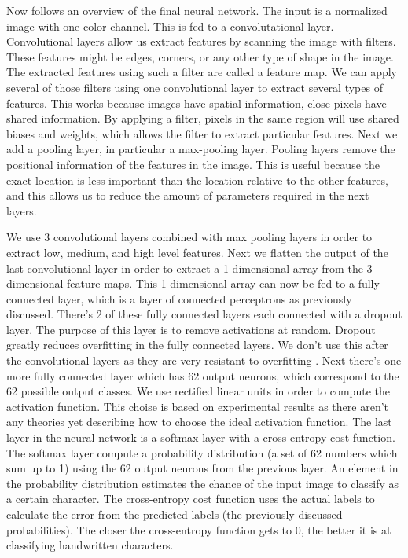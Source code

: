 \documentclass{article}
\begin{document}
Now follows an overview of the final neural network. The input is a normalized image with one color channel. This is fed to a convolutational layer. Convolutional layers allow us extract features by scanning the image with filters. These features might be edges, corners, or any other type of shape in the image. The extracted features using such a filter are called a feature map. We can apply several of those filters using one convolutional layer to extract several types of features. This works because images have spatial information, close pixels have shared information. By applying a filter, pixels in the same region will use shared biases and weights, which allows the filter to extract particular features. Next we add a pooling layer, in particular a max-pooling layer. Pooling layers remove the positional information of the features in the image. This is useful because the exact location is less important than the location relative to the other features, and this allows us to reduce the amount of parameters required in the next layers. 

We use 3 convolutional layers combined with max pooling layers in order to extract low, medium, and high level features. Next we flatten the output of the last convolutional layer in order to extract a 1-dimensional array from the 3-dimensional feature maps. This 1-dimensional array can now be fed to a fully connected layer, which is a layer of connected perceptrons as previously discussed. There's 2 of these fully connected layers each connected with a dropout layer. The purpose of this layer is to remove activations at random. Dropout greatly reduces overfitting in the fully connected layers. We don't use this after the convolutional layers as they are very resistant to overfitting \cite{nnbook}. Next there's one more fully connected layer which has 62 output neurons, which correspond to the 62 possible output classes. We use rectified linear units in order to compute the activation function. This choise is based on experimental results as there aren't any theories yet describing how to choose the ideal activation function.  The last layer in the neural network is a softmax layer with a cross-entropy cost function. The softmax layer compute a probability distribution (a set of 62 numbers which sum up to 1) using the 62 output neurons from the previous layer. An element in the probability distribution estimates the chance of the input image to classify as a certain character. The cross-entropy cost function uses the actual labels to calculate the error from the predicted labels (the previously discussed probabilities). The closer the cross-entropy function gets to 0, the better it is at classifying handwritten characters.
\end{document}
